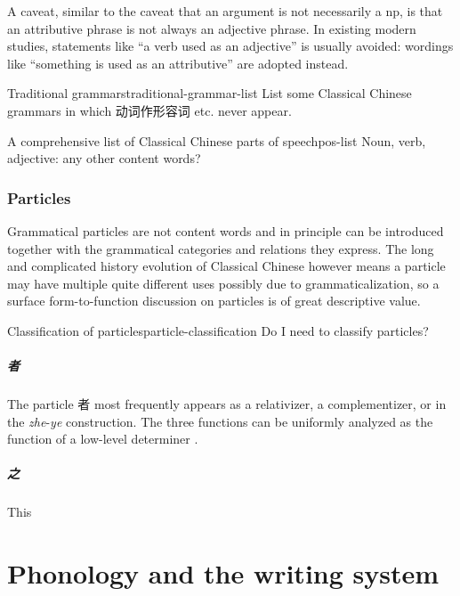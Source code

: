 \documentclass[UTF8, a4paper, oneside, scheme=plain, 12pt]{ctexrep}
\newcommand{\form}[1]{\emph{#1}}
\begin{document}
A caveat, similar to the caveat that an argument is not necessarily a \ac{np},
is that an attributive phrase is not always an adjective phrase.
In existing modern studies, statements like ``a verb used as an adjective'' is usually avoided:
wordings like ``something is used as an attributive'' are adopted instead.

\begin{todobox}{Traditional grammars}{traditional-grammar-list}
    List some Classical Chinese grammars in which 动词作形容词 etc. never appear.
\end{todobox}

\begin{todobox}{A comprehensive list of Classical Chinese parts of speech}{pos-list}
    Noun, verb, adjective: any other content words?
\end{todobox}

\subsection{Particles}

Grammatical particles are not content words
and in principle can be introduced together with the grammatical categories and relations they express.
The long and complicated history evolution of Classical Chinese
however means a particle may have multiple quite different uses
possibly due to grammaticalization,
so a surface form-to-function discussion on particles is of great descriptive value.

\begin{todobox}{Classification of particles}{particle-classification}
    Do I need to classify particles?
\end{todobox}

\paragraph*{者} The particle 者 most frequently appears as a relativizer, a complementizer,
or in the \form{zhe}-\form{ye} construction.
The three functions can be uniformly analyzed as the function of a low-level determiner \citep{aldridge2009old}. 

\paragraph*{之} This 

\chapter{Phonology and the writing system}
\end{document}
